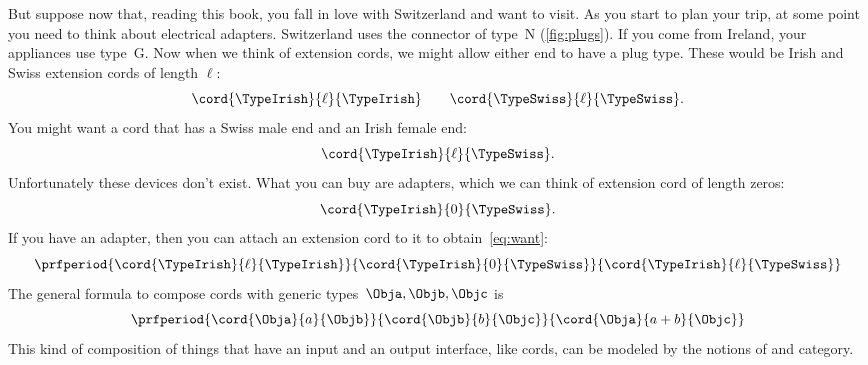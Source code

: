 But suppose now that, reading this book, you fall in love with Switzerland and want to visit.
As you start to plan your trip, at some point you need to think about electrical adapters.
Switzerland uses the connector of type~N (\cref{fig:plugs}).
If you come from Ireland, your appliances use type~G.
Now when we think of extension cords, we might allow either end to have a plug type.
%
These would be Irish and Swiss extension cords of length $\ell$:
%
\begin{equation}
    \label{eq:irish-swiss}
    {\cord{\TypeIrish}{\ell}{\TypeIrish} \qquad \cord{\TypeSwiss}{\ell}{\TypeSwiss}}.
\end{equation}
%
You might want a cord that has a Swiss male end and an Irish female end:
%
\begin{equation}
    \label{eq:want}
    {\cord{\TypeIrish}{\ell}{\TypeSwiss}}.
\end{equation}
%
Unfortunately these devices don't exist.
What you can buy are adapters, which we can think of extension cord of length zeros:
\begin{equation}
    {\cord{\TypeIrish}{0}{\TypeSwiss}}.
\end{equation}
%
If you have an adapter, then you can attach an extension cord to it to obtain~\cref{eq:want}:
%
\begin{equation}
    \label{eq:irish-swiss-result}
    \prfperiod{
        \cord{\TypeIrish}{\ell}{\TypeIrish}
    }{
        \cord{\TypeIrish}{0}{\TypeSwiss}
    }{
        \cord{\TypeIrish}{\ell}{\TypeSwiss}
    }
\end{equation}
%
The general formula to compose cords with generic types~$\Obja, \Objb, \Objc$ is
%
\begin{equation}
    \label{eq:cords-generic}
    \prfperiod{
        \cord{\Obja}{a}{\Objb}
    }{
        \cord{\Objb}{b}{\Objc}
    }{
        \cord{\Obja}{a+b}{\Objc}
    }
\end{equation}
%
This kind of composition of things that have an input and an output interface, like cords, can be modeled by the notions of  and category.


%
%
%

